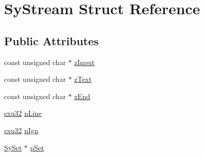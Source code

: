 \hypertarget{struct_sy_stream}{\section{Sy\-Stream Struct Reference}
\label{d2/d3d/struct_sy_stream}
}
\subsection*{Public Attributes}
\begin{DoxyCompactItemize}
\item 
const unsigned char $\ast$ \hyperlink{struct_sy_stream_ae2b6e8c79b3f669cb7d11fdd55e7de21}{z\-Input}
\item 
const unsigned char $\ast$ \hyperlink{struct_sy_stream_a7b5cbcd1b335e0b84c57c67ed78c0b06}{z\-Text}
\item 
const unsigned char $\ast$ \hyperlink{struct_sy_stream_abb89b218eab35e23bc8a5e890c7e5f4b}{z\-End}
\item 
\hyperlink{unqlite_8c_abc5a8a3f345c200c98c485551f49666e}{sxu32} \hyperlink{struct_sy_stream_a1d8f5169a8dede1b23fe7414bad069e3}{n\-Line}
\item 
\hyperlink{unqlite_8c_abc5a8a3f345c200c98c485551f49666e}{sxu32} \hyperlink{struct_sy_stream_a467ff3e158480ea2e6a9624981739997}{n\-Ign}
\item 
\hyperlink{struct_sy_set}{Sy\-Set} $\ast$ \hyperlink{struct_sy_stream_ab1e9ea75226a6980ed6424ecdb42742d}{p\-Set}
\end{DoxyCompactItemize}


